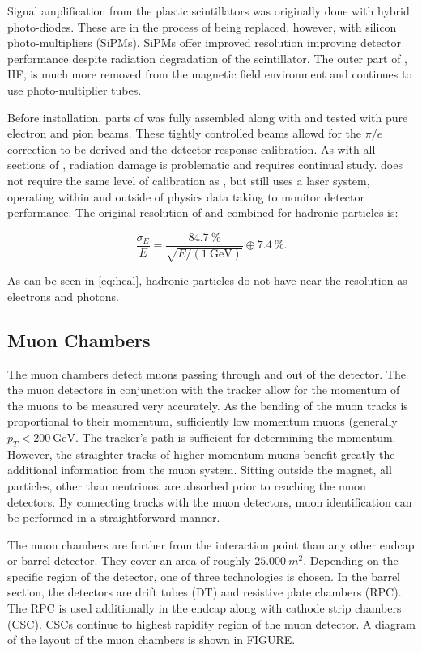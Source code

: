 Signal amplification from the plastic scintillators was originally done with hybrid photo-diodes.  These are in the process of being replaced, however, with silicon photo-multipliers (SiPMs).  SiPMs offer improved resolution improving detector performance despite radiation degradation of the scintillator.  The outer part of \HCAL, HF, is much more removed from the magnetic field environment and continues to use photo-multiplier tubes.

Before installation, parts of \HCAL was fully assembled along with \ECAL and tested with pure electron and pion beams.  These tightly controlled beams allowd for the \ensuremath{\pi / e} correction to be derived and the detector response calibration.  As with all sections of \CMS, radiation damage is problematic and requires continual study.  \HCAL does not require the same level of calibration as \ECAL, but still uses a laser system, operating within and outside of physics data taking to monitor detector performance.  The original resolution of \CMS \ECAL and \HCAL combined for hadronic particles is:

\begin{equation}\label{eq:hcal}
    \frac{\sigma_{E}}{E}
    =   
    \frac{\SI{84.7}{\%}}{\sqrt{E/\left(\SI{1}{\GeV}\right)}}
    \oplus
    \SI{7.4}{\%}.
\end{equation}

As can be seen in \ref{eq:hcal}, hadronic particles do not have near the resolution as electrons and photons. 

\subsection{Muon Chambers}
The muon chambers detect muons passing through and out of the detector.  The the muon detectors in conjunction with the tracker allow for the momentum of the muons to be measured very accurately. As the bending of the muon tracks is proportional to their momentum, sufficiently low momentum muons (generally \ensuremath{p_T < \SI{200}{\GeV}}.  The tracker's path is sufficient for determining the momentum.  However, the straighter tracks of higher momentum muons benefit greatly the additional information from the muon system. Sitting outside the \CMS magnet, all particles, other than neutrinos, are absorbed prior to reaching the muon detectors.  By connecting tracks with the muon detectors, muon identification can be performed in a straightforward manner.

The muon chambers are further from the interaction point than any other endcap or barrel detector.  They cover an area of roughly \ensuremath{\SI{25,000}{m^2}}.  Depending on the specific region of the detector, one of three technologies is chosen.  In the barrel section, the detectors are drift tubes (DT) and resistive plate chambers (RPC).  The RPC is used additionally in the endcap along with cathode strip chambers (CSC).  CSCs continue to highest rapidity region of the muon detector.  A diagram of the layout of the muon chambers is shown in FIGURE.

